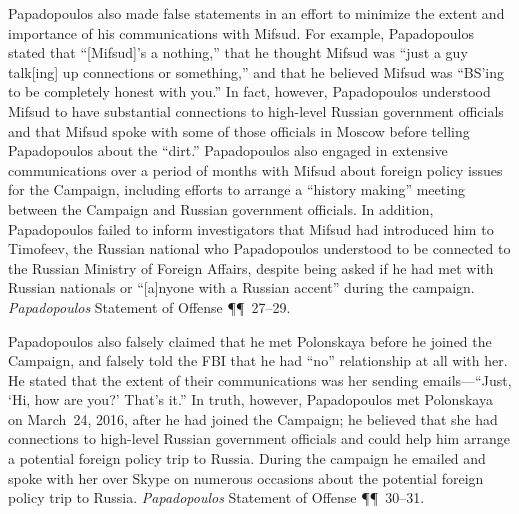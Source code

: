 Papadopoulos also made false statements in an effort to minimize the extent and importance of his communications with Mifsud.
For example, Papadopoulos stated that ``[Mifsud]'s a nothing,'' that he thought Mifsud was ``just a guy talk[ing] up connections or something,'' and that he believed Mifsud was ``BS'ing to be completely honest with you.''
In fact, however, Papadopoulos understood Mifsud to have substantial connections to high-level Russian government officials and that Mifsud spoke with some of those officials in Moscow before telling Papadopoulos about the ``dirt.''
Papadopoulos also engaged in extensive communications over a period of months with Mifsud about foreign policy issues for the Campaign, including efforts to arrange a ``history making'' meeting between the Campaign and Russian government officials.
In addition, Papadopoulos failed to inform investigators that Mifsud had introduced him to Timofeev, the Russian national who Papadopoulos understood to be connected to the Russian Ministry of Foreign Affairs, despite being asked if he had met with Russian nationals or ``[a]nyone with a Russian accent'' during the campaign.
\textit{Papadopoulos} Statement of Offense \P\P~27--29.

Papadopoulos also falsely claimed that he met Polonskaya before he joined the Campaign, and falsely told the FBI that he had ``no'' relationship at all with her.
He stated that the extent of their communications was her sending emails---``Just, `Hi, how are you?' That's it.''
In truth, however, Papadopoulos met Polonskaya on March~24, 2016, after he had joined the Campaign; he believed that she had connections to high-level Russian government officials and could help him arrange a potential foreign policy trip to Russia.
During the campaign he emailed and spoke with her over Skype on numerous occasions about the potential foreign policy trip to Russia.
\textit{Papadopoulos} Statement of Offense \P\P~30--31.

